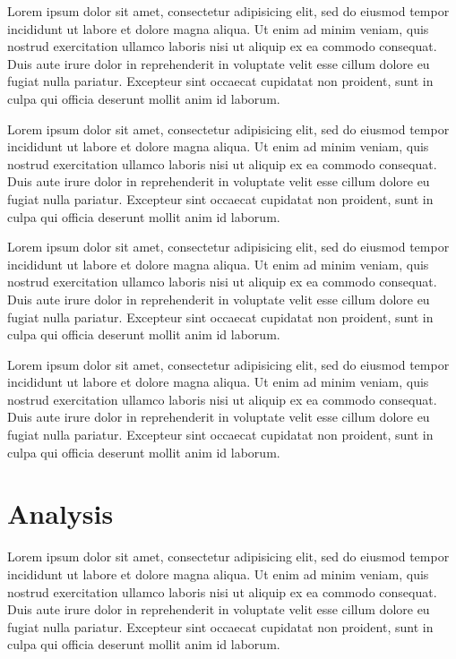 \documentclass[11pt,letterpaper]{article}
\begin{document}
Lorem ipsum dolor sit amet, consectetur adipisicing elit, sed do eiusmod tempor incididunt ut labore et dolore magna aliqua. Ut enim ad minim veniam, quis nostrud exercitation ullamco laboris nisi ut aliquip ex ea commodo consequat. Duis aute irure dolor in reprehenderit in voluptate velit esse cillum dolore eu fugiat nulla pariatur. Excepteur sint occaecat cupidatat non proident, sunt in culpa qui officia deserunt mollit anim id laborum.

Lorem ipsum dolor sit amet, consectetur adipisicing elit, sed do eiusmod tempor incididunt ut labore et dolore magna aliqua. Ut enim ad minim veniam, quis nostrud exercitation ullamco laboris nisi ut aliquip ex ea commodo consequat. Duis aute irure dolor in reprehenderit in voluptate velit esse cillum dolore eu fugiat nulla pariatur. Excepteur sint occaecat cupidatat non proident, sunt in culpa qui officia deserunt mollit anim id laborum.

Lorem ipsum dolor sit amet, consectetur adipisicing elit, sed do eiusmod tempor incididunt ut labore et dolore magna aliqua. Ut enim ad minim veniam, quis nostrud exercitation ullamco laboris nisi ut aliquip ex ea commodo consequat. Duis aute irure dolor in reprehenderit in voluptate velit esse cillum dolore eu fugiat nulla pariatur. Excepteur sint occaecat cupidatat non proident, sunt in culpa qui officia deserunt mollit anim id laborum.

Lorem ipsum dolor sit amet, consectetur adipisicing elit, sed do eiusmod tempor incididunt ut labore et dolore magna aliqua. Ut enim ad minim veniam, quis nostrud exercitation ullamco laboris nisi ut aliquip ex ea commodo consequat. Duis aute irure dolor in reprehenderit in voluptate velit esse cillum dolore eu fugiat nulla pariatur. Excepteur sint occaecat cupidatat non proident, sunt in culpa qui officia deserunt mollit anim id laborum.

\section{Analysis}

Lorem ipsum dolor sit amet, consectetur adipisicing elit, sed do eiusmod tempor incididunt ut labore et dolore magna aliqua. Ut enim ad minim veniam, quis nostrud exercitation ullamco laboris nisi ut aliquip ex ea commodo consequat. Duis aute irure dolor in reprehenderit in voluptate velit esse cillum dolore eu fugiat nulla pariatur. Excepteur sint occaecat cupidatat non proident, sunt in culpa qui officia deserunt mollit anim id laborum.
\end{document}
